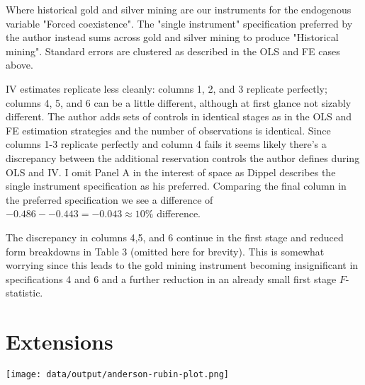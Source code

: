 \documentclass{article}
\begin{document}
Where historical gold and silver mining are our instruments for the endogenous variable "Forced coexistence". The "single instrument" specification preferred by the author instead sums across gold and silver mining to produce "Historical mining".
Standard errors are clustered as described in the OLS and FE cases above.


IV estimates replicate less cleanly: columns 1, 2, and 3 replicate perfectly; columns 4, 5, and 6 can be a little different, although at first glance not sizably different. The author 
adds sets of controls in identical stages as in the OLS and FE estimation strategies and the number of observations is identical. Since columns 1-3 
replicate perfectly and column 4 fails it seems likely there's a discrepancy between the additional reservation controls the author defines during OLS
and IV. I omit Panel A in the interest of space as Dippel describes the single instrument specification as his preferred. Comparing the final column in the preferred specification 
we see a difference of $-0.486 - - 0.443 = -0.043 \approx 10\%$ difference.

% 


 The discrepancy in columns 4,5, and 6 continue in the first stage and reduced form breakdowns in Table 3 (omitted here for brevity). This is
somewhat worrying since this leads to the gold mining instrument becoming insignificant in specifications 4 and 6 and a further reduction in an already small 
first stage $F$-statistic. 

\section{Extensions}
\texttt{[image: data/output/anderson-rubin-plot.png]}
\end{document}
